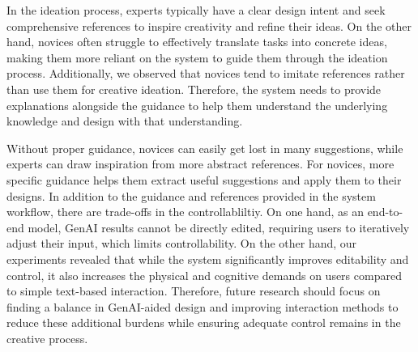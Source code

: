 In the ideation process, experts typically have a clear design intent and seek comprehensive references to inspire creativity and refine their ideas. On the other hand, novices often struggle to effectively translate tasks into concrete ideas, making them more reliant on the system to guide them through the ideation process.
Additionally, we observed that novices tend to imitate references rather than use them for creative ideation. Therefore, the system needs to provide explanations alongside the guidance to help them understand the underlying knowledge and design with that understanding. 

Without proper guidance, novices can easily get lost in many suggestions, while experts can draw inspiration from more abstract references. For novices, more specific guidance helps them extract useful suggestions and apply them to their designs.
In addition to the guidance and references provided in the system workflow, there are trade-offs in the controllabliltiy. On one hand, as an end-to-end model, GenAI results cannot be directly edited, requiring users to iteratively adjust their input, which limits controllability. On the other hand, our experiments revealed that while the system significantly improves editability and control, it also increases the physical and cognitive demands on users compared to simple text-based interaction. Therefore, future research should focus on finding a balance in GenAI-aided design and improving interaction methods to reduce these additional burdens while ensuring adequate control remains in the creative process.


